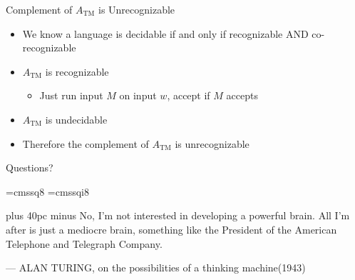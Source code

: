 \documentclass[aspectratio=169]{beamer}
\begin{document}
\begin{frame}{Complement of $A_{\text{TM}}$ is Unrecognizable}
    \begin{itemize}
        \item We know a language is decidable if and only if recognizable AND co-recognizable \pause
        \item $A_{\text{TM}}$ is recognizable
        \begin{itemize}
            \item Just run input $M$ on input $w$, accept if $M$ accepts
        \end{itemize} \pause
        \item $A_{\text{TM}}$ is undecidable \pause
        \item Therefore the complement of $A_{\text{TM}}$ is unrecognizable
    \end{itemize}
\end{frame}

\begin{frame}{}
    \begin{center}
        {\color{sigma@mainblue} \LARGE Questions?}
    \end{center}
\end{frame}

\font\eightss=cmssq8
\font\eightssi=cmssqi8
\newcommand\quoteAuthorDate[3]{\begingroup
  \baselineskip 10pt
  \parfillskip 0pt
  \interlinepenalty 10000 %
  \leftskip 0pt plus 40pc minus \parindent
  \let\rm=\eightss
  \let\sl=\eightssi
  \everypar{\sl}#1\par
  \nobreak\smallskip
  \noindent\rm--- #2\unskip\enspace(#3)\par
  \endgroup}
\begin{frame}
    \begin{center}
        \item \quoteAuthorDate{No, I'm not interested in developing a powerful brain. All I'm after is just a mediocre brain, something like the President of the American Telephone and Telegraph Company.}{ALAN TURING, on the possibilities of a thinking machine}{1943}
    \end{center}
\end{frame}
\end{document}
